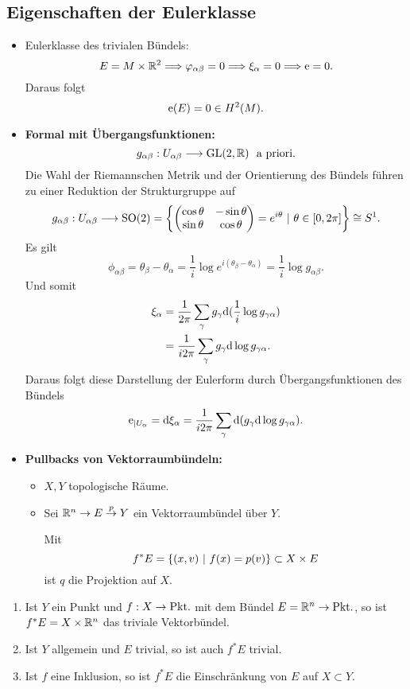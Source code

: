 \subsection{Eigenschaften der Eulerklasse}
\begin{itemize}
	\item Eulerklasse des trivialen Bündels:
	\[ E = M\times \mathbb{R}^2 \overset{}{\Longrightarrow} \varphi_{\alpha\beta} = 0 \overset{}{\Longrightarrow} \xi_\alpha = 0 \overset{}{\Longrightarrow} \mathrm{e} = 0. \]
	Daraus folgt
	\[ \mathrm{e}(E) = 0 \in H^2(M). \]
	\item \textbf{Formal mit Übergangsfunktionen:}
	\[ g_{\alpha \beta} :U_{\alpha \beta} \overset{}{\longrightarrow} \mathrm{GL}(2, \mathbb{R}) ~~\text{a priori.} \]
	Die Wahl der Riemannschen Metrik und der Orientierung des Bündels führen zu einer Reduktion der Strukturgruppe auf
	\[ g_{\alpha \beta} :U_{\alpha \beta} \Pfeil{} \mathrm{SO}(2) = \set{
\left(\begin{matrix}
\cos \theta & -\sin \theta\\
\sin \theta & \cos \theta
\end{matrix}\right)	= e^{i\theta}
}{\theta \in [0,2\pi]} \isom{} S^1. \]
Es gilt
\[ \phi_{\alpha \beta} = \theta_\beta - \theta_\alpha = \frac{1}{i} \log e^{i(\theta_\beta - \theta_\alpha)} = \frac{1}{i} \log g_{\alpha \beta}. \]
Und somit
\begin{align*}
\xi_\alpha &= \frac{1}{2\pi} \sum_\gamma g_\gamma \text{d} (\frac{1}{i} \log g_{\gamma \alpha})\\
 &= \frac{1}{i2\pi} \sum_\gamma g_\gamma \text{d} \log g_{\gamma \alpha}.\\
\end{align*}
Daraus folgt diese Darstellung der Eulerform durch Übergangsfunktionen des Bündels
\[ \mathrm{e}_{|U_\alpha} = \text{d} \xi_\alpha =
\frac{1}{i2\pi} \sum_\gamma \text{d} (g_\gamma \text{d} \log  g_{\gamma \alpha}).
 \]
	\item \textbf{Pullbacks von Vektorraumbündeln:}\\
	\begin{itemize}
		\item $X,Y$ topologische Räume.
		\item Sei $\mathbb{R}^n \overset{}{\rightarrow} E \overset{p}{\rightarrow} Y$ ein Vektorraumbündel über $Y$.
		\begin{center}
		\end{center}
	Mit
	\[ f^*E = \set{(x,v)}{f(x) = p(v)} \subset X \times E \]
	ist $q$ die Projektion auf $X$.
	\end{itemize}
\end{itemize}
\Bsp{}
\begin{enumerate}[1)]
	\item Ist $Y$ ein Punkt und $f : X \overset{}{\rightarrow} \text{Pkt.}$ mit dem Bündel $E = \mathbb{R}^n \overset{}{\rightarrow} \text{Pkt.}$, so ist $f^* E = X \times \mathbb{R}^n$ das triviale Vektorbündel.
	\item Ist $Y$ allgemein und $E$ trivial, so ist auch $f^* E$ trivial.
	\item Ist $f$ eine Inklusion, so ist $f^*E$ die Einschränkung von $E$ auf $X \subset Y$. 
\end{enumerate}


